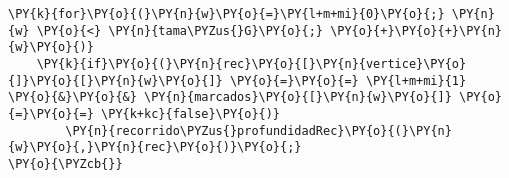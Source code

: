\begin{Verbatim}[commandchars=\\\{\}]
    \PY{k}{for}\PY{o}{(}\PY{n}{w}\PY{o}{=}\PY{l+m+mi}{0}\PY{o}{;} \PY{n}{w} \PY{o}{<} \PY{n}{tama\PYZus{}G}\PY{o}{;} \PY{o}{+}\PY{o}{+}\PY{n}{w}\PY{o}{)}
	\PY{k}{if}\PY{o}{(}\PY{n}{rec}\PY{o}{[}\PY{n}{vertice}\PY{o}{]}\PY{o}{[}\PY{n}{w}\PY{o}{]} \PY{o}{=}\PY{o}{=} \PY{l+m+mi}{1} \PY{o}{&}\PY{o}{&} \PY{n}{marcados}\PY{o}{[}\PY{n}{w}\PY{o}{]} \PY{o}{=}\PY{o}{=} \PY{k+kc}{false}\PY{o}{)}
	    \PY{n}{recorrido\PYZus{}profundidadRec}\PY{o}{(}\PY{n}{w}\PY{o}{,}\PY{n}{rec}\PY{o}{)}\PY{o}{;}
\PY{o}{\PYZcb{}}
\end{Verbatim}
